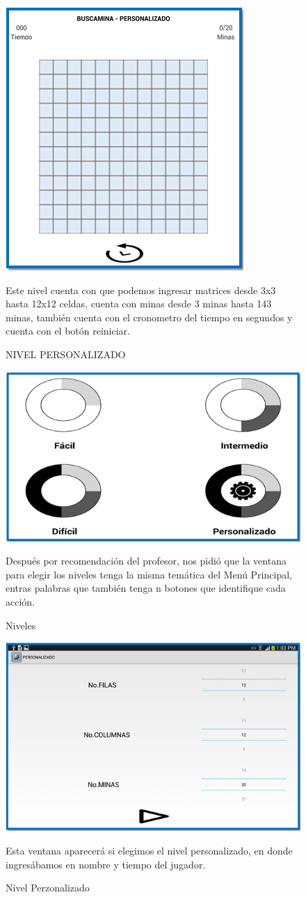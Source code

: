 \begin{figure}[htbp]
\begin{center}
\includegraphics[width=.30\textwidth]{./imagenes/tablero5.png}
\caption{NIVEL PERSONALIZADO}
\end{center}

Este nivel cuenta con que podemos ingresar matrices desde 3x3 hasta 12x12 celdas, cuenta con minas desde 3 minas hasta 143 minas, también cuenta con el cronometro del tiempo en segundos y cuenta con el botón reiniciar.
\end{figure}


\begin{figure}[htbp]
\begin{center}
\includegraphics[width=.65\textwidth]{./imagenes/niveles2.png}
\caption{Niveles}
\end{center}

Después por recomendación del profesor, nos pidió que la ventana para elegir los niveles tenga la misma temática del Menú Principal, entras palabras que también tenga n botones que identifique cada acción.
\end{figure}

\begin{figure}[htbp]
\begin{center}
\includegraphics[width=.65\textwidth]{./imagenes/perzonalizado.png}
\caption{Nivel Perzonalizado}
\end{center}
Esta ventana aparecerá si elegimos el nivel personalizado, en donde ingresábamos en nombre y tiempo del jugador.
\end{figure}

